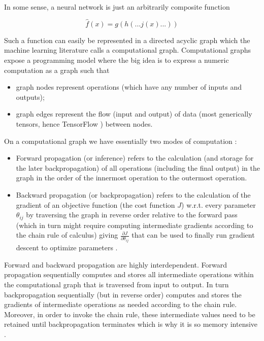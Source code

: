 In some sense, a neural network is just an arbitrarily composite function

\begin{equation}
\hat{f}(x) = g(h( ... j(x) ... ))
\end{equation}

Such a function can easily be represented in a directed acyclic graph which the machine learning literature calls a computational graph. Computational graphs expose a programming model where the big idea is to express a numeric computation as a graph such that

\begin{itemize}
    \item graph nodes represent operations (which have any number of inputs and outputs);
    \item graph edges represent the flow (input and output) of data (most generically tensors, hence TensorFlow \cite{tensorflow}) between nodes.
\end{itemize}

On a computational graph we have essentially two modes of computation \cite{deeplearning}:

\begin{itemize}
    \item Forward propagation (or inference) refers to the calculation (and storage for the later backpropagation) of all operations (including the final output) in the graph in the order of the innermost operation to the outermost operation.
    \item Backward propagation (or backpropagation) refers to the calculation of the gradient of an objective function (the cost function $J$) w.r.t. every parameter $\theta_{ij}$ by traversing the graph in reverse order relative to the forward pass (which in turn might require computing intermediate gradients according to the chain rule of calculus) giving $\frac{\partial J}{\partial \theta_{ij}}$ that can be used to finally run gradient descent to optimize parameters \cite{deeplearning}.
\end{itemize}

Forward and backward propagation are highly interdependent. Forward propagation sequentially computes and stores all intermediate operations within the computational graph that is traversed from input to output. In turn backpropagation sequentially (but in reverse order) computes and stores the gradients of intermediate operations as needed according to the chain rule. Moreover, in order to invoke the chain rule, these intermediate values need to be retained until backpropagation terminates which is why it is so memory intensive \cite{deeplearning}.

